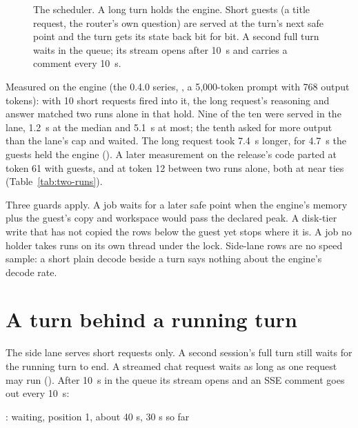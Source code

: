 \begin{figure}[htbp]
\centering

\caption[The scheduler: side lane and queue]{The scheduler. A long turn holds the engine. Short guests (a title request, the router's own question) are served at the turn's next safe point and the turn gets its state back bit for bit. A second full turn waits in the queue; its stream opens after 10~s and carries a comment every 10~s.}\label{fig:side-lane}
\end{figure}

Measured on the engine (the 0.4.0 series, , a 5,000-token prompt with 768 output tokens): with 10 short requests fired into it, the long request's reasoning and answer matched two runs alone in that hold. Nine of the ten were served in the lane, 1.2~s at the median and 5.1~s at most; the tenth asked for more output than the lane's cap and waited. The long request took 7.4~s longer, for 4.7~s the guests held the engine (\measured). A later measurement on the release's code parted at token 61 with guests, and at token 12 between two runs alone, both at near ties (Table~\ref{tab:two-runs}).

Three guards apply. A job waits for a later safe point when the engine's memory plus the guest's copy and workspace would pass the declared peak. A disk-tier write that has not copied the rows below the guest yet stops where it is. A job no holder takes runs on its own thread under the lock. Side-lane rows are no speed sample: a short plain decode beside a turn says nothing about the engine's decode rate.

\section{A turn behind a running turn}

The side lane serves short requests only. A second session's full turn still waits for the running turn to end. A streamed chat request waits as long as one request may run (). After 10~s in the queue its stream opens and an SSE comment goes out every 10~s:

\begin{plain}
: waiting, position 1, about 40 s, 30 s so far
\end{plain}

